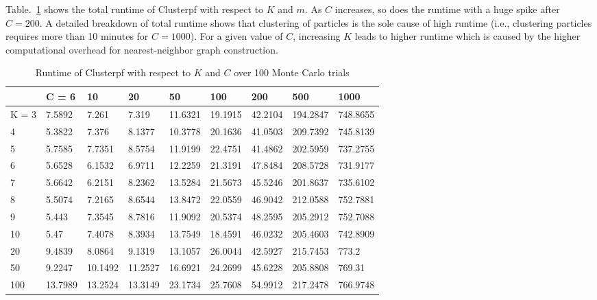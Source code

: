 \documentclass[10pt,letterpaper,final]{article}
\begin{document}
Table.~\ref{tab:runtime_Clusterpf} shows the total runtime of Clusterpf with respect to $K$ and $m$. As $C$ increases, so does the runtime with a huge spike after $C=200$. A detailed breakdown of total runtime shows that clustering of particles is the sole cause of high runtime (i.e., clustering particles requires more than 10 minutes for $C=1000$). For a given value of $C$, increasing $K$ leads to higher runtime which is caused by the higher computational overhead for nearest-neighbor graph construction. 

\begin{table}[h!]
\centering
\begin{tabular}{|l|l|l|l|l|l|l|l|l|}
\hline
      & C = 6   & 10      & 20      & 50      & 100     & 200     & 500      & 1000     \\ \hline
K = 3 & 7.5892  & 7.261   & 7.319   & 11.6321 & 19.1915 & 42.2104 & 194.2847 & 748.8655 \\ \hline
4     & 5.3822  & 7.376   & 8.1377  & 10.3778 & 20.1636 & 41.0503 & 209.7392 & 745.8139 \\ \hline
5     & 5.7585  & 7.7351  & 8.5754  & 11.9199 & 22.4751 & 41.4862 & 202.5959 & 737.2755 \\ \hline
6     & 5.6528  & 6.1532  & 6.9711  & 12.2259 & 21.3191 & 47.8484 & 208.5728 & 731.9177 \\ \hline
7     & 5.6642  & 6.2151  & 8.2362  & 13.5284 & 21.5673 & 45.5246 & 201.8637 & 735.6102 \\ \hline
8     & 5.5074  & 7.2165  & 8.6544  & 13.8472 & 22.0559 & 46.9042 & 212.0588 & 752.7881 \\ \hline
9     & 5.443   & 7.3545  & 8.7816  & 11.9092 & 20.5374 & 48.2595 & 205.2912 & 752.7088 \\ \hline
10    & 5.47    & 7.4078  & 8.3934  & 13.7549 & 18.4591 & 46.0232 & 205.4603 & 742.8909 \\ \hline
20    & 9.4839  & 8.0864  & 9.1319  & 13.1057 & 26.0044 & 42.5927 & 215.7453 & 773.2    \\ \hline
50    & 9.2247  & 10.1492 & 11.2527 & 16.6921 & 24.2699 & 45.6228 & 205.8808 & 769.31   \\ \hline
100   & 13.7989 & 13.2524 & 13.3149 & 23.1734 & 25.7608 & 54.9912 & 217.2478 & 766.9748 \\ \hline
\end{tabular}
\caption{Runtime of Clusterpf with respect to $K$ and $C$ over 100 Monte Carlo trials}
\label{tab:runtime_Clusterpf}
\end{table}
\end{document}
